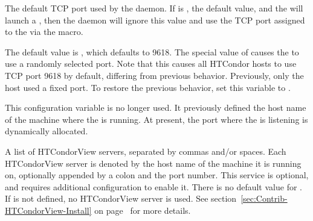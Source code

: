 \begin{description}
\label{param:SharedPortPort}
\item[\Macro{SHARED\_PORT\_PORT}]
  The default TCP port used by the  daemon.
  If  is , the default value, 
  and the  will launch a ,
  then the  daemon will ignore this value 
  and use the TCP port assigned to the  
  via the  macro.

  The default value is , which defaults to 9618.  
  The special value of  causes the  
  to use a randomly selected port.  
  Note that this causes all HTCondor hosts to use TCP port 9618 by default, 
  differing from previous behavior.
  Previously, only the  host used a fixed port.
  To restore the previous behavior, 
  set this variable to .

\label{param:NegotiatorHost} 
\item[\Macro{NEGOTIATOR\_HOST}]
  This configuration variable is no longer used.
  It previously defined the host name of the machine where 
  the  is running.
  At present, the port where the  is listening 
  is dynamically allocated. 


\label{param:CondorViewHost}
\item[\Macro{CONDOR\_VIEW\_HOST}]
  A list of HTCondorView servers, separated by commas and/or spaces.
  Each HTCondorView server is denoted by the host name of the machine
  it is running on, optionally appended by a colon and the port number.
  This service is optional, and requires additional configuration 
  to enable it.  There is no default value for
  .  If  is not
  defined, no HTCondorView server is used.
  See section~\ref{sec:Contrib-HTCondorView-Install} on
  page~\pageref{sec:Contrib-HTCondorView-Install} for more details.


\end{description}
